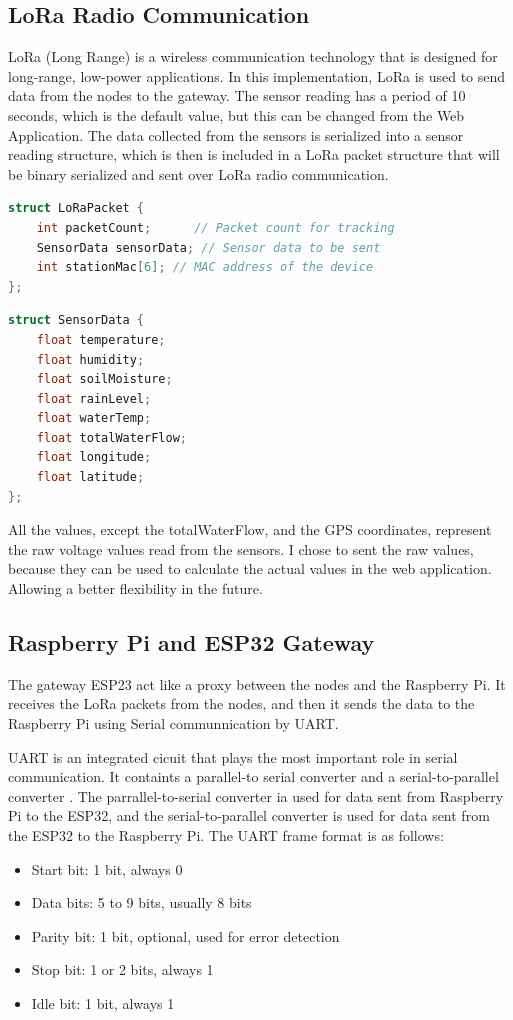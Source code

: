\subsection{LoRa Radio Communication}
LoRa (Long Range) is a wireless communication technology 
that is designed for long-range, low-power applications.
In this implementation, LoRa is used to send data from the nodes to the gateway.
The sensor reading has a period of 10 seconds, which is the default value, but this can be changed from the Web Application.
The data collected from the sensors is serialized into a sensor reading structure, 
which is then is included in a LoRa packet structure that will be 
binary serialized and sent over LoRa radio communication.

\begin{lstlisting}[language=C, caption={LoRa packet structure}]
struct LoRaPacket {
    int packetCount;      // Packet count for tracking
    SensorData sensorData; // Sensor data to be sent
    int stationMac[6]; // MAC address of the device
};
\end{lstlisting}

\begin{lstlisting}[language=C, caption={Sensor reading structure}]
struct SensorData {
    float temperature;
    float humidity;
    float soilMoisture;
    float rainLevel;
    float waterTemp;
    float totalWaterFlow;
    float longitude;
    float latitude;
};
\end{lstlisting}

All the values, except the totalWaterFlow, and the GPS coordinates, represent the raw
voltage values read from the sensors. I chose to sent the raw values, 
because they can be used to calculate the actual values in the web application.
Allowing a better flexibility in the future.

\subsection{Raspberry Pi and ESP32 Gateway}
The gateway ESP23 act like a proxy between the nodes and the Raspberry Pi.
It receives the LoRa packets from the nodes, and then it sends the data to 
the Raspberry Pi using Serial communnication by UART.

UART is an integrated cicuit that plays the most important role in serial communication.
It containts a parallel-to serial converter and a serial-to-parallel converter\cite{uderstandingUart}
\cite{laddha2013review}. The 
parrallel-to-serial converter ia used for data sent from Raspberry Pi to the ESP32,
and the serial-to-parallel converter is used for data sent from the ESP32 to the Raspberry Pi.
The UART frame format is as follows:
\begin{itemize}
    \item Start bit: 1 bit, always 0
    \item Data bits: 5 to 9 bits, usually 8 bits
    \item Parity bit: 1 bit, optional, used for error detection
    \item Stop bit: 1 or 2 bits, always 1
    \item Idle bit: 1 bit, always 1
\end{itemize}

